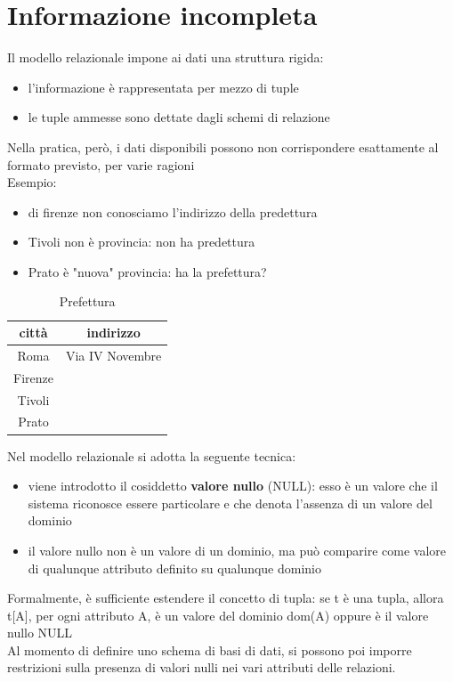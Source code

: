 \section{Informazione incompleta}
Il modello relazionale impone ai dati una struttura rigida:\\
\begin{itemize}
    \item l'informazione è rappresentata per mezzo di tuple
    \item le tuple ammesse sono dettate dagli schemi di relazione
\end{itemize}
\noindent Nella pratica, però, i dati disponibili possono non corrispondere esattamente al formato previsto, per varie ragioni\\
Esempio:
\begin{itemize}
    \item di firenze non conosciamo l'indirizzo della predettura
    \item Tivoli non è provincia: non ha predettura
    \item Prato è "nuova" provincia: ha la prefettura?
\end{itemize}
\begin{table}[h]
    \centering
    \begin{tabular}{|c|c|}
        \hline
        \textbf{città} & \textbf{indirizzo} \\
        \hline
        Roma & Via IV Novembre \\
        \hline
        Firenze & \\
        \hline
        Tivoli & \\
        \hline
        Prato & \\
        \hline
    \end{tabular}
    \caption{Prefettura}
\end{table}
\noindent Nel modello relazionale si adotta la seguente tecnica:
\begin{itemize}
    \item viene introdotto il cosiddetto \textbf{valore nullo} (NULL): esso è un valore che il sistema riconosce essere particolare e che denota l'assenza di un valore del dominio
    \item il valore nullo non è un valore di un dominio, ma può comparire come valore di qualunque attributo definito su qualunque dominio
\end{itemize}
\noindent Formalmente, è sufficiente estendere il concetto di tupla: se t è una tupla, allora t[A], per ogni attributo A, è un valore del dominio dom(A) oppure è il valore nullo NULL\\
Al momento di definire uno schema di basi di dati, si possono poi imporre restrizioni sulla presenza di valori nulli nei vari attributi delle relazioni.
